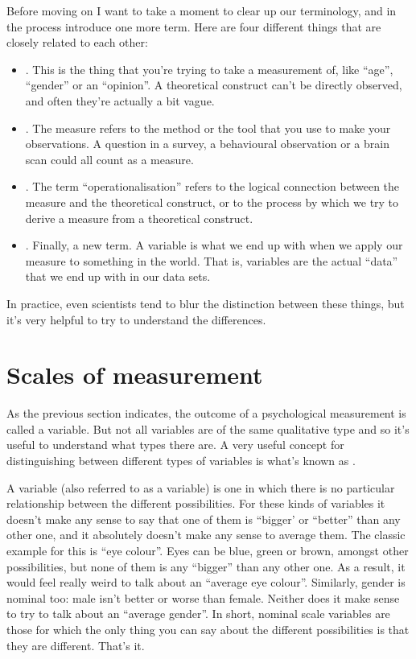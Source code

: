 Before moving on I want to take a moment to clear up our terminology, and in the process introduce one more term. Here are four different things that are closely related to each other:

\begin{itemize}
\item {}. This is the thing that you're trying to take a measurement of, like ``age'', ``gender'' or an ``opinion''. A theoretical construct can't be directly observed, and often they're actually a bit vague. 
\item {}. The measure refers to the method or the tool that you use to make your observations. A question in a survey, a behavioural observation or a brain scan could all count as a measure. 
\item {}. The term ``operationalisation'' refers to the logical connection between the measure and the theoretical construct, or to the process by which we try to derive a measure from a theoretical construct.
\item {}. Finally, a new term. A variable is what we end up with when we apply our measure to something in the world. That is, variables are the actual ``data'' that we end up with in our data sets.
\end{itemize}

\noindent
In practice, even scientists tend to blur the distinction between these things, but it's very helpful to try to understand the differences.

\section{Scales of measurement\label{sec:scales}}

As the previous section indicates, the outcome of a psychological measurement is called a  variable. But not all variables are of the same qualitative type and so it's useful to understand what types there are. A very useful concept for distinguishing between different types of variables is what's known as . 



A  variable (also referred to as a  variable) is one in which there is no particular relationship between the different possibilities. For these kinds of variables it doesn't make any sense to say that one of them is ``bigger' or ``better'' than any other one, and it absolutely doesn't make any sense to average them. The classic example for this is ``eye colour''. Eyes can be blue, green or brown, amongst other possibilities, but none of them is any ``bigger'' than any other one. As a result, it would feel really weird to talk about an ``average eye colour''. Similarly, gender is nominal too: male isn't better or worse than female. Neither does it make sense to try to talk about an ``average gender''. In short, nominal scale variables are those for which the only thing you can say about the different possibilities is that they are different. That's it.

